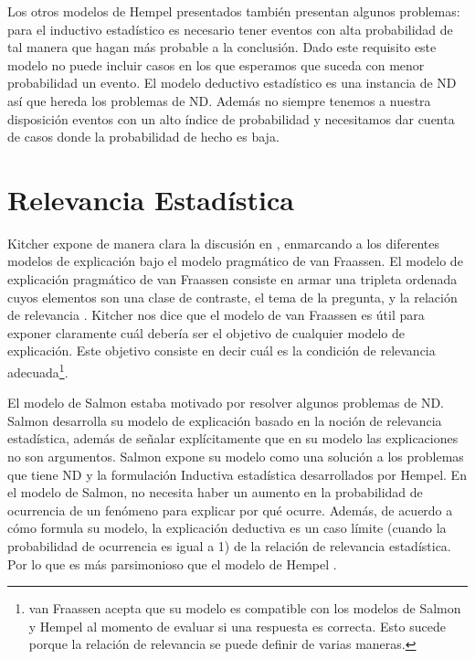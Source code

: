 {Los otros modelos de Hempel presentados también presentan algunos problemas: para el inductivo estadístico es necesario tener eventos con alta probabilidad de tal manera que hagan más probable a la conclusión. Dado este requisito este modelo no puede incluir casos en los que esperamos que suceda con menor probabilidad un evento. El modelo deductivo estadístico es una instancia de ND así que hereda los problemas de ND.  Además no siempre tenemos a nuestra disposición eventos con un alto índice de probabilidad y necesitamos dar cuenta de casos donde la probabilidad de hecho es baja.

\section{Relevancia Estadística}

\noindent Kitcher expone de manera clara la discusión en \citeyear{Kitcher2002}, enmarcando a los diferentes modelos de explicación bajo el modelo pragmático de van Fraassen. El modelo de explicación pragmático de van Fraassen consiste en armar una tripleta ordenada cuyos elementos son una clase de contraste, el tema de la pregunta, y la relación de relevancia \cite{Fraassen1977}. Kitcher nos dice que el modelo de van Fraassen es útil para exponer claramente cuál debería ser el objetivo de cualquier modelo de explicación. Este objetivo consiste en decir cuál es la condición de relevancia adecuada\footnote{van Fraassen acepta que su modelo es compatible con los modelos de Salmon y Hempel al momento de evaluar si una respuesta es correcta. Esto sucede porque la relación de relevancia se puede definir de varias maneras\cite{Fraassen}.}.

El modelo de Salmon estaba motivado por resolver algunos problemas de ND. Salmon desarrolla su modelo de explicación basado en la noción de relevancia estadística, además de señalar explícitamente que en su modelo las explicaciones no son argumentos. Salmon expone su modelo como una solución a los problemas que tiene ND y la formulación Inductiva estadística desarrollados por Hempel. En el modelo de Salmon, no necesita haber un aumento en la probabilidad de ocurrencia de un fenómeno para explicar por qué ocurre. Además, de acuerdo a cómo formula su modelo, la explicación deductiva es un caso límite (cuando la probabilidad de ocurrencia es igual a 1) de la relación de relevancia estadística. Por lo que es más parsimonioso que el modelo de Hempel \cite{Salmon1970}.

}
